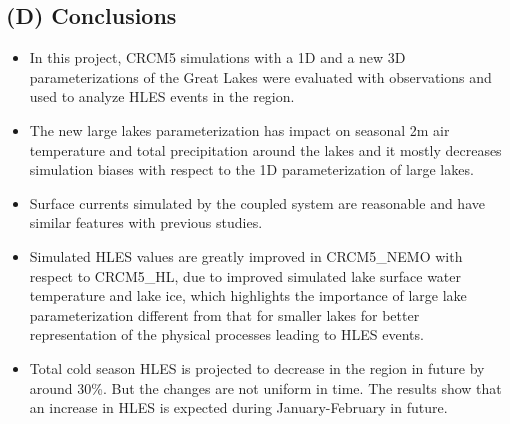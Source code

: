 \documentclass[a0b,landscape]{a0poster}
\begin{document}
\begin{multicols*}{4}

{
  \color{SaddleBrown} %

  \section*{(D) Conclusions}

  \begin{itemize}
  \item In this project, CRCM5 simulations with a 1D and a new 3D parameterizations of the Great Lakes were evaluated with observations and used to analyze HLES events in the region.
  \item The new large lakes parameterization has impact on seasonal 2m air temperature and total precipitation
        around the lakes and it mostly decreases simulation biases with respect to the
        1D parameterization of large lakes.
  \item Surface currents simulated by the coupled system are reasonable and have similar features with previous studies.
  \item Simulated HLES values are greatly improved in CRCM5\_NEMO with respect to
        CRCM5\_HL, due to improved simulated lake surface water temperature and lake
        ice, which highlights the importance of large lake parameterization different
        from that for smaller lakes for better representation of the physical processes
        leading to HLES events.
  \item Total cold season HLES is projected to decrease in the region in future by around 30\%. But the changes are not
        uniform in time. The results show that an increase in HLES is expected during January-February in future.
  \end{itemize}
}


\end{multicols*}
\end{document}
